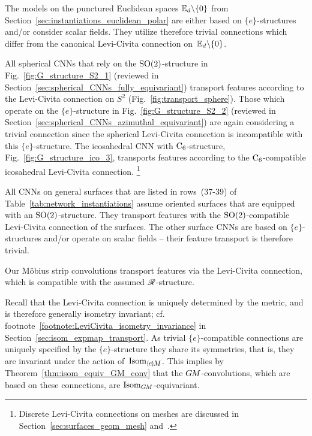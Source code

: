 The models on the punctured Euclidean spaces $\mathbb{E}_d \backslash \{0\}$ from Section~\ref{sec:instantiations_euclidean_polar} are either based on $\{e\}$-structures and/or consider scalar fields.
They utilize therefore trivial connections which differ from the canonical Levi-Civita connection on~$\mathbb{E}_d \backslash \{0\}$.

All spherical CNNs that rely on the $\operatorname{SO}(2)$-structure in Fig.~\ref{fig:G_structure_S2_1} (reviewed in Section~\ref{sec:spherical_CNNs_fully_equivariant}) transport features according to the Levi-Civita connection on $S^2$ (Fig.~\ref{fig:transport_sphere}).
Those which operate on the $\{e\}$-structure in Fig.~\ref{fig:G_structure_S2_2} (reviewed in Section~\ref{sec:spherical_CNNs_azimuthal_equivariant}) are again considering a trivial connection since the spherical Levi-Civita connection is incompatible with this $\{e\}$-structure.
The icosahedral CNN with $\operatorname{C}_{6}$-structure, Fig.~\ref{fig:G_structure_ico_3}, transports features according to the $\operatorname{C}_{6}$-compatible icosahedral Levi-Civita connection.%
\footnote{
    Discrete Levi-Civita connections on meshes are discussed in Section~\ref{sec:surfaces_geom_mesh} and~\cite{craneDiscreteDifferentialGeometry2014,craneTrivialConnectionsDiscrete2010}.
}

All CNNs on general surfaces that are listed in rows~(37-39) of Table~\ref{tab:network_instantiations}
assume oriented surfaces that are equipped with an $\operatorname{SO}(2)$-structure.
They transport features with the $\operatorname{SO}(2)$-compatible Levi-Civita connection of the surfaces.
The other surface CNNs are based on $\{e\}$-structures and/or operate on scalar fields -- their feature transport is therefore trivial.

Our M\"obius strip convolutions transport features via the Levi-Civita connection, which is compatible with the assumed $\mathscr{R}$-structure.

Recall that the Levi-Civita connection is uniquely determined by the metric, and is therefore generally isometry invariant; cf. footnote~\ref{footnote:LeviCivita_isometry_invariance} in Section~\ref{sec:isom_expmap_transport}.
As trivial $\{e\}$-compatible connections are uniquely specified by the $\{e\}$-structure they share its symmetries, that is, they are invariant under the action of~$\IsomeM$.
This implies by Theorem~\ref{thm:isom_equiv_GM_conv} that the $G\mkern-1.4muM$-convolutions, which are based on these connections, are $\operatorname{Isom}_{G\mkern-1.4muM}$-equivariant.




